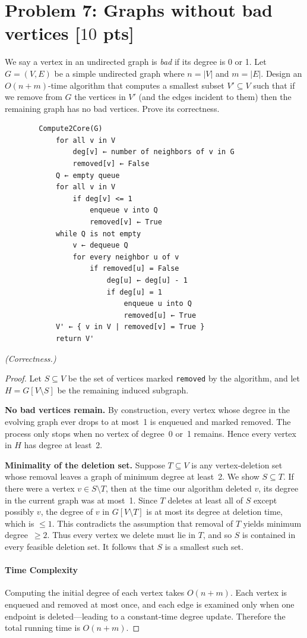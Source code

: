 \documentclass[letterpaper, 11pt]{article}
\newcommand{\1}{\mathds{1}}	%
\theoremstyle{definition}
\newcommand{\problem}[1]{\section*{Problem #1}}
\newenvironment{solution}{{\par\noindent\it Solution.}}{}
\begin{document}
\problem{7: Graphs without bad vertices [$10$ pts]}
We say a vertex in an undirected graph is \textit{bad} if its degree is 0 or 1.
Let $G = (V,E)$ be a simple undirected graph where $n = |V|$ and $m = |E|$.
Design an $O(n+m)$-time algorithm that computes a smallest subset $V' \subseteq V$ such that if we remove from $G$ the vertices in $V'$ (and the edges incident to them) then the remaining graph has no bad vertices. Prove its correctness.
\begin{solution}
    \begin{lstlisting}
        Compute2Core(G)
            for all v in V
                deg[v] ← number of neighbors of v in G
                removed[v] ← False
            Q ← empty queue
            for all v in V
                if deg[v] <= 1
                    enqueue v into Q
                    removed[v] ← True
            while Q is not empty
                v ← dequeue Q
                for every neighbor u of v
                    if removed[u] = False
                        deg[u] ← deg[u] - 1
                        if deg[u] = 1
                            enqueue u into Q
                            removed[u] ← True
            V' ← { v in V | removed[v] = True }
            return V'
        \end{lstlisting}
        \emph{(Correctness.)}  
        \begin{proof}
            Let \(S\subseteq V\) be the set of vertices marked \texttt{removed} by the algorithm, and let \(H=G[V\setminus S]\) be the remaining induced subgraph.  

            \noindent\textbf{No bad vertices remain.} By construction, every vertex whose degree in the evolving graph ever drops to at most 1 is enqueued and marked removed. The process only stops when no vertex of degree 0 or 1 remains. Hence every vertex in \(H\) has degree at least 2.
            
            \noindent\textbf{Minimality of the deletion set.} Suppose \(T\subseteq V\) is any vertex‑deletion set whose removal leaves a graph of minimum degree at least 2. We show \(S\subseteq T\). If there were a vertex \(v\in S\setminus T\), then at the time our algorithm deleted \(v\), its degree in the current graph was at most 1. Since \(T\) deletes at least all of \(S\) except possibly \(v\), the degree of \(v\) in \(G[V\setminus T]\) is at most its degree at deletion time, which is \(\le1\). This contradicts the assumption that removal of \(T\) yields minimum degree \(\ge2\). Thus every vertex we delete must lie in \(T\), and so \(S\) is contained in every feasible deletion set. It follows that \(S\) is a smallest such set.
        
            
            \paragraph*{Time Complexity}
            Computing the initial degree of each vertex takes \(O(n+m)\). Each vertex is enqueued and removed at most once, and each edge is examined only when one endpoint is deleted—leading to a constant‑time degree update. Therefore the total running time is \(O(n+m)\).
            \end{proof}
\end{solution}
\end{document}
